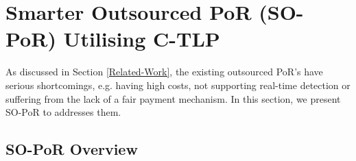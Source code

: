 


\section{Smarter Outsourced PoR (SO-PoR) Utilising C-TLP}
 As discussed in Section \ref{Related-Work}, the existing outsourced PoR's  have serious shortcomings, e.g. having high costs, not supporting real-time detection or suffering from the lack of a fair payment mechanism. In this section, we present SO-PoR to addresses them. 
 
 


 
\subsection{SO-PoR Overview} 






